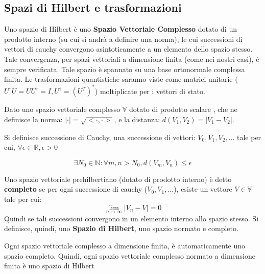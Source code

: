 \subsection{Spazi di Hilbert e trasformazioni}
Uno spazio di Hilbert è uno \textbf{Spazio Vettoriale Complesso} dotato di un prodotto interno (su cui si andrà a definire una norma), le cui successioni di vettori di cauchy convergono asintoticamente a un elemento dello spazio stesso. Tale convergenza, per spazi vettoriali a dimensione finita (come nei nostri casi), è sempre verificata. Tale spazio è spannato su una base ortonormale complessa finita. Le trasformazioni quantistiche saranno viste come matrici unitarie (\(U^\dagger U = U U^\dagger = I, U^\dagger = (U^T)^*\)) moltiplicate per i vettori di stato.

\begin{info}
Dato uno spazio vettoriale complesso \(\mathbb{V}\) dotato di prodotto scalare \(<-,->\), che ne definisce la norma: \(| \cdot | = \sqrt{<\cdot,\cdot>}\), e la distanza: \(d(V_1,V_2) = |V_1 - V_2|\).

Si definisce successione di Cauchy, una successione di vettori: \(V_0, V_1, V_2, \dots\) tale per cui, \(\forall \epsilon \in \mathbb{R}, \epsilon > 0\)

\[
\exists N_0 \in \mathbb{N} : \forall m,n > N_0, d(V_m, V_n) \le \epsilon
\]

Uno spazio vettoriale prehilbertiano (dotato di prodotto interno) è detto \textbf{completo} se per ogni successione di cauchy (\(V_0, V_1, \dots\)), esiste un vettore \(V \in \mathbb{V}\) tale per cui:
\[
\lim_{n \to \infty} |V_n - V| = 0
\]
Quindi se tali successioni convergono in un elemento interno allo spazio stesso. Si definisce, quindi, uno \textbf{Spazio di Hilbert}, uno spazio normato e completo.

Ogni spazio vettoriale complesso a dimensione finita, è automaticamente uno spazio completo. Quindi, ogni spazio vettoriale complesso normato a dimensione finita è uno spazio di Hilbert
\end{info}